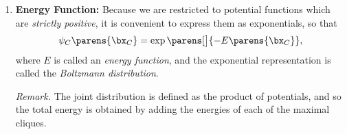 \documentclass[12pt]{article}
\begin{document}
\begin{enumerate}[label=\textbf{\arabic*.}]
%		
%		
%		

	\item \textbf{Energy Function:} Because we are restricted to potential functions which are \emph{strictly positive}, it is convenient to express them as exponentials, so that 
	\begin{align}
		\psi_C \parens{\bx_C} = \exp \parens[\big]{- E \parens{\bx_C}}, 
	\end{align}
	where $E$ is called an \emph{energy function}, and the exponential representation is called the \emph{Boltzmann distribution}. 
	
	\textit{Remark.} The joint distribution is defined as the product of potentials, and so the total energy is obtained by adding the energies of each of the maximal cliques. 

\end{enumerate}
\end{document}
